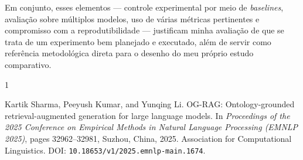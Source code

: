 \documentclass{article}
\begin{document}
	Em conjunto, esses elementos --- controle experimental por meio de
	\textit{baselines}, avaliação sobre múltiplos modelos, uso de várias métricas
	pertinentes e compromisso com a reprodutibilidade --- justificam minha avaliação
	de que se trata de um experimento bem planejado e executado, além de servir como
	referência metodológica direta para o desenho do meu próprio estudo comparativo.
	
	\begin{thebibliography}{1}
		
		Kartik Sharma, Peeyush Kumar, and Yunqing Li.
		\newblock OG-RAG: Ontology-grounded retrieval-augmented generation for large language models.
		\newblock In \textit{Proceedings of the 2025 Conference on Empirical Methods in Natural Language Processing (EMNLP 2025)}, pages 32962--32981, Suzhou, China, 2025. Association for Computational Linguistics.
		\newblock DOI: \texttt{10.18653/v1/2025.emnlp-main.1674}.
		
	\end{thebibliography}
	
\end{document}
